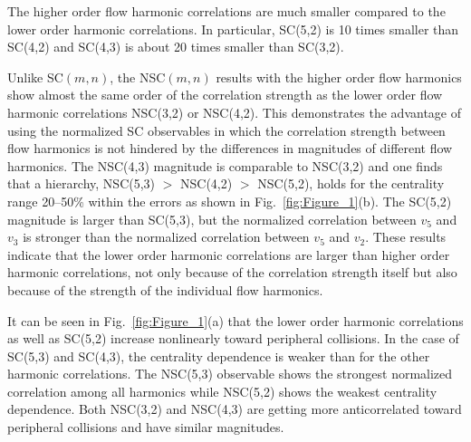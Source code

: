 The higher order flow harmonic correlations are much smaller compared to the lower order harmonic correlations.
In particular, SC(5,2) is 10 times smaller than SC(4,2) and SC(4,3) is about 20 times smaller than SC(3,2).

Unlike SC$(m,n)$, the NSC$(m,n)$ results with the higher order flow harmonics show almost the same order of the correlation strength as the lower order flow harmonic correlations NSC(3,2) or NSC(4,2).
This demonstrates the advantage of using the normalized SC observables in which the correlation strength between flow harmonics is not hindered by the differences in magnitudes of different flow harmonics. The NSC(4,3) magnitude is comparable to NSC(3,2) and one finds that a hierarchy, NSC(5,3) $>$ NSC(4,2) $>$ NSC(5,2), holds for the centrality range 20--50\% within the errors as shown in Fig.~\ref{fig:Figure_1}(b).
The SC(5,2) magnitude is larger than SC(5,3), but the normalized correlation between $v_5$ and $v_3$ is stronger than the normalized correlation between $v_5$ and $v_2$. 
These results indicate that the lower order harmonic correlations are larger than higher order harmonic correlations, not only because of the correlation strength itself but also because of the strength of the individual flow harmonics.

It can be seen in Fig.~\ref{fig:Figure_1}(a) that the lower order harmonic correlations as well as SC(5,2) increase nonlinearly toward peripheral collisions.
In the case of SC(5,3) and SC(4,3), the centrality dependence is weaker than for the other harmonic correlations.
The NSC(5,3) observable shows the strongest normalized correlation among all harmonics while NSC(5,2) shows the weakest centrality dependence.
Both NSC(3,2) and NSC(4,3) are getting more anticorrelated toward peripheral collisions and have similar magnitudes.

